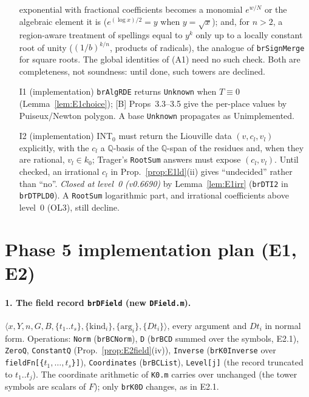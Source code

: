 \documentclass[11pt]{article}
\theoremstyle{definition}
\theoremstyle{remark}
\newcommand{\Q}{\mathbb{Q}}
\newcommand{\code}[1]{\texttt{#1}}
\begin{document}
\begin{itemize}
  exponential with fractional coefficients becomes a monomial $e^{w/N}$ or the algebraic element
  it is ($e^{(\log x)/2}=y$ when $y=\sqrt x$); and, for $n>2$, a region-aware treatment of
  spellings equal to $y^k$ only up to a locally constant root of unity ($(1/b)^{k/n}$, products
  of radicals), the analogue of \code{brSignMerge} for square roots. The global identities of
  (A1) need no such check. Both are completeness, not soundness: until done, such towers are
  declined.
\item[I1] (implementation) \code{brAlgRDE} returns \code{Unknown} when $T\equiv0$
  (Lemma~\ref{lem:E1choice}); [B] Props~3.3--3.5 give the per-place values by Puiseux/Newton
  polygon. A base \code{Unknown} propagates as Unimplemented.
\item[I2] (implementation) INT$_0$ must return the Liouville data $(v,c_l,v_l)$ explicitly, with
  the $c_l$ a $\Q$-basis of the $\Q$-span of the residues and, when they are rational, $v_l\in
  k_0$; Trager's \code{RootSum} answers must expose $(c_l,v_l)$. Until checked, an irrational
  $c_l$ in Prop.~\ref{prop:E1ld}(ii) gives ``undecided'' rather than ``no''. \emph{Closed at
  level~0 (v0.6690)} by Lemma~\ref{lem:E1irr} (\code{brDTI2} in \code{brDTPLD0}). A
  \code{RootSum} logarithmic part, and irrational coefficients above level~0 (OL3), still
  decline.
\end{itemize}

\section*{Phase 5 implementation plan (E1, E2)}
\label{sec:P5plan}

\paragraph{1. The field record \code{brDField} (new \code{DField.m}).}
$\langle x,Y,n,G,B,\{t_1..t_s\},\{\text{kind}_i\},\{\text{arg}_i\},\{Dt_i\}\rangle$, every
argument and $Dt_i$ in normal form. Operations: \code{Norm} (\code{brBCNorm}), \code{D}
(\code{brBCD} summed over the symbols, E2.1), \code{ZeroQ}, \code{ConstantQ}
(Prop.~\ref{prop:E2field}(iv)), \code{Inverse} (\code{brK0Inverse} over
\code{fieldFn[\{}$t_1,\dots,t_s$\code{\}]}), \code{Coordinates} (\code{brBCList}), \code{Level[j]} (the record
truncated to $t_1..t_j$). The coordinate arithmetic of \code{K0.m} carries over unchanged
(the tower symbols are scalars of $F$); only \code{brK0D} changes, as in E2.1.
\end{document}

